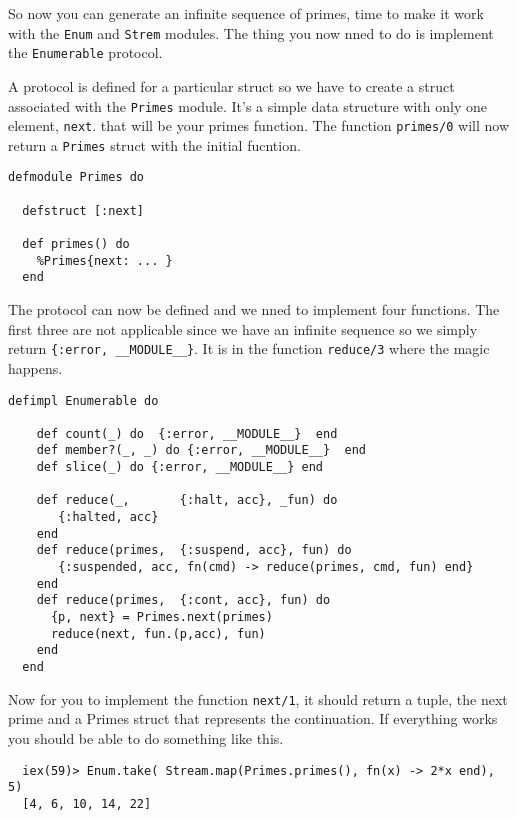 \documentclass[a4paper,11pt]{article}
\begin{document}
So now you can generate an infinite sequence of primes, time to make
it work with the {\tt Enum} and {\tt Strem} modules. The thing you now
nned to do is implement the {\tt Enumerable} protocol.

A protocol is defined for a particular struct so we have to create a
struct associated with the {\tt Primes} module. It's a simple data
structure with only one element, {\tt next}. that will be your primes
function. The function {\tt primes/0} will now return a {\tt Primes}
struct with the initial fucntion. 

\begin{verbatim}
defmodule Primes do

  defstruct [:next]

  def primes() do
    %Primes{next: ... }
  end
\end{verbatim}

The protocol can now be defined and we nned to implement four
functions. The first three are not applicable since we have an
infinite sequence so we simply return {\tt\{:error, \_\_MODULE\_\_\}}. It
is in the function {\tt reduce/3} where the magic happens.

\begin{verbatim}
defimpl Enumerable do

    def count(_) do  {:error, __MODULE__}  end
    def member?(_, _) do {:error, __MODULE__}  end
    def slice(_) do {:error, __MODULE__} end

    def reduce(_,       {:halt, acc}, _fun) do
       {:halted, acc}
    end
    def reduce(primes,  {:suspend, acc}, fun) do
       {:suspended, acc, fn(cmd) -> reduce(primes, cmd, fun) end}
    end
    def reduce(primes,  {:cont, acc}, fun) do
      {p, next} = Primes.next(primes)
      reduce(next, fun.(p,acc), fun)
    end      
  end
\end{verbatim}

Now for you to implement the function {\tt next/1}, it should return a
tuple, the next prime and a Primes struct that represents the
continuation. If everything works you should be able to do something like this.

\begin{verbatim}
  iex(59)> Enum.take( Stream.map(Primes.primes(), fn(x) -> 2*x end), 5)
  [4, 6, 10, 14, 22]
\end{verbatim}
\end{document}
